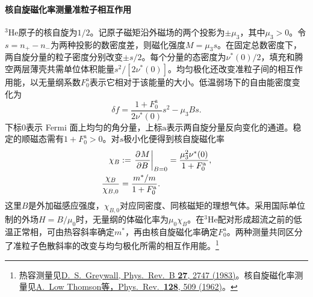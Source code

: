 \paragraph{核自旋磁化率测量准粒子相互作用}
$^3\mathrm{He}$原子的核自旋为$1/2$。记原子磁矩沿外磁场的两个投影为$\pm\mu_3$，其中$\mu_3 > 0$。令$s = n_+ - n_-$为两种投影的数密度差，则磁化强度$M = \mu_3 s$。在固定总数密度下，两自旋分量的粒子密度分别改变$\pm s/2$。每个分量的态密度为$\nu^*(0)/2$，填充和腾空两层薄壳共需单位体积能量$s^2/[2\nu^*(0)]$。均匀极化还改变准粒子间的相互作用能，以无量纲系数$F_0^{\mathrm a}$表示它相对于该能量的大小。低温弱场下的自由能密度变化为
\[
	\delta f = \frac{1 + F_0^{\mathrm a}}{2\nu^*(0)}s^2 - \mu_3 B s .
\]
下标$0$表示 Fermi 面上均匀的角分量，上标$\mathrm a$表示两自旋分量反向变化的通道。稳定的顺磁态需有$1 + F_0^{\mathrm a} > 0$。对$s$极小化便得到核自旋磁化率
\begin{subequations}
	\label{eq:sm-fermi-liquid-susceptibility}
	\begin{align}
		\chi_B &:= \left.\frac{\partial^{}M}{\partial{B}^{}}\right|_{B=0}
		= \frac{\mu_3^2\nu^*(0)}{1 + F_0^{\mathrm a}},\\
		\frac{\chi_B}{\chi_{B,0}} &= \frac{m^*/m}{1 + F_0^{\mathrm a}} .
	\end{align}
\end{subequations}
这里$B$是外加磁感应强度，$\chi_{B,0}$对应同密度、同核磁矩的理想气体。采用国际单位制的外场$H = B/\mu_0$时，无量纲的体磁化率为$\mu_0\chi_B$。在$^3\mathrm{He}$配对形成超流之前的低温正常相，可由热容斜率确定$m^*$，再由核自旋磁化率确定$F_0^{\mathrm a}$。两种测量共同区分了准粒子色散斜率的改变与均匀极化所需的相互作用能。\footnote{热容测量见\href{https://doi.org/10.1103/PhysRevB.27.2747}{D.~S.~Greywall, Phys.\ Rev.\ B \textbf{27}, 2747 (1983)}。核自旋磁化率测量见\href{https://doi.org/10.1103/PhysRev.128.509}{A.~Low Thomson等，Phys.\ Rev.\ \textbf{128}, 509 (1962)}。}
